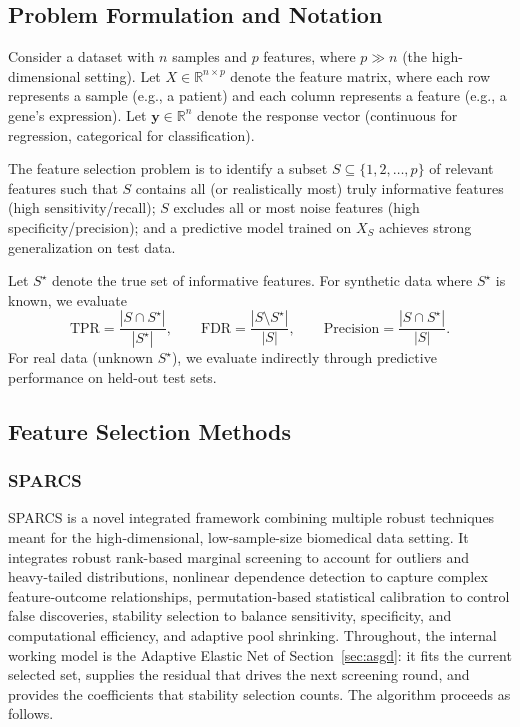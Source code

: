 \documentclass[11pt]{article}
\begin{document}
\subsection{Problem Formulation and Notation}

Consider a dataset with $n$ samples and $p$ features, where $p \gg n$ (the high-dimensional setting).
Let $X \in \mathbb{R}^{n \times p}$ denote the feature matrix, where each row represents a sample
(e.g., a patient) and each column represents a feature (e.g., a gene's expression). Let
$\mathbf{y} \in \mathbb{R}^{n}$ denote the response vector (continuous for regression, categorical
for classification).

The feature selection problem is to identify a subset $S \subseteq \{1, 2, \dots, p\}$ of relevant
features such that $S$ contains all (or realistically most) truly informative features (high
sensitivity/recall); $S$ excludes all or most noise features (high specificity/precision); and a
predictive model trained on $X_S$ achieves strong generalization on test data.

Let $S^\star$ denote the true set of informative features. For synthetic data where $S^\star$ is
known, we evaluate
\begin{equation}
\mathrm{TPR} = \frac{|S \cap S^\star|}{|S^\star|}, \qquad
\mathrm{FDR} = \frac{|S \setminus S^\star|}{|S|}, \qquad
\mathrm{Precision} = \frac{|S \cap S^\star|}{|S|}.
\end{equation}
For real data (unknown $S^\star$), we evaluate indirectly through predictive performance on held-out
test sets.

\subsection{Feature Selection Methods}

\subsubsection{SPARCS}

SPARCS is a novel integrated framework combining multiple robust techniques meant for the
high-dimensional, low-sample-size biomedical data setting. It integrates robust rank-based marginal
screening to account for outliers and heavy-tailed distributions, nonlinear dependence detection to
capture complex feature-outcome relationships, permutation-based statistical calibration to control
false discoveries, stability selection to balance sensitivity, specificity, and computational
efficiency, and adaptive pool shrinking. Throughout, the internal working model is the Adaptive
Elastic Net of Section~\ref{sec:asgd}: it fits the current selected set, supplies the residual that
drives the next screening round, and provides the coefficients that stability selection counts. The
algorithm proceeds as follows.
\end{document}
